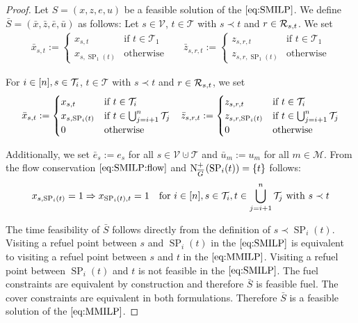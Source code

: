 \begin{proof}

Let ${S=(x,z,e,u)}$ be a feasible solution of the $\eqref{eq:SMILP}$. We define ${\bar{S}=\left(\bar{x},\bar{z},\bar{e},\bar{u}\right)}$ as follows: Let ${s\in\mathcal{V}}$, ${t\in\mathcal{T}}$ with ${s\prec t}$ and ${r\in\mathcal{R}_{s,t}}$. We set
\begin{align*}
	\bar{x}_{s,t} := \begin{cases} x_{s,t} & \text{if } t\in\mathcal{T}_1 \\ x_{s,\operatorname{SP}_1(t)} & \text{otherwise} \end{cases} &&
	\bar{z}_{s,r,t} := \begin{cases} z_{s,r,t} & \text{if } t\in\mathcal{T}_1 \\ z_{s,r,\operatorname{SP}_1(t)} & \text{otherwise} \end{cases}
\end{align*}

For ${i\in[n]}, {s\in\mathcal{T}_i}$, ${t\in\mathcal{T}}$ with ${s\prec t}$ and ${r\in\mathcal{R}_{s,t}}$, we set
\begin{align*}
	\bar{x}_{s,t} := \begin{cases} x_{s,t} & \text{if } t\in\mathcal{T}_i \\ x_{s,\operatorname{SP}_i(t)} & \text{if } t\in\bigcup_{j=i+1}^n \mathcal{T}_j \\ 0 & \text{otherwise} \end{cases} &&
	\bar{z}_{s,r,t} := \begin{cases} z_{s,r,t} & \text{if } t\in\mathcal{T}_i \\ z_{s,r,\operatorname{SP}_i(t)} & \text{if } t\in\bigcup_{j=i+1}^n \mathcal{T}_j \\ 0 & \text{otherwise} \end{cases}
\end{align*}

Additionally, we set ${\bar{e}_s := e_s}$ for all ${s\in\mathcal{V}\cupdot\mathcal{T}}$ and ${\bar{u}_m := u_m}$ for all ${m\in\mathcal{M}}$. From the flow conservation $\eqref{eq:SMILP:flow}$ and ${\operatorname{N}_{\overline{G}}^+\left(\operatorname{SP}_i(t)\right)=\{t\}}$ follows:
\begin{align*}
	x_{s,\operatorname{SP}_i(t)}=1 \Rightarrow x_{\operatorname{SP}_i(t),t}=1 && \text{for } i\in[n], s\in\mathcal{T}_i, t\in\bigcup_{j=i+1}^n \mathcal{T}_j \text{ with } s\prec t
\end{align*}

The time feasibility of $\bar{S}$ follows directly from the definition of ${s\prec\operatorname{SP}_i(t)}$. Visiting a refuel point between $s$ and $\operatorname{SP}_i(t)$ in the $\eqref{eq:SMILP}$ is equivalent to visiting a refuel point between $s$ and $t$ in the $\eqref{eq:MMILP}$. Visiting a refuel point between $\operatorname{SP}_i(t)$ and $t$ is not feasible in the $\eqref{eq:SMILP}$. The fuel constraints are equivalent by construction and therefore $\bar{S}$ is feasible \wrt fuel. The cover constraints are equivalent in both formulations. Therefore $\bar{S}$ is a feasible solution of the $\eqref{eq:MMILP}$.


\end{proof}
